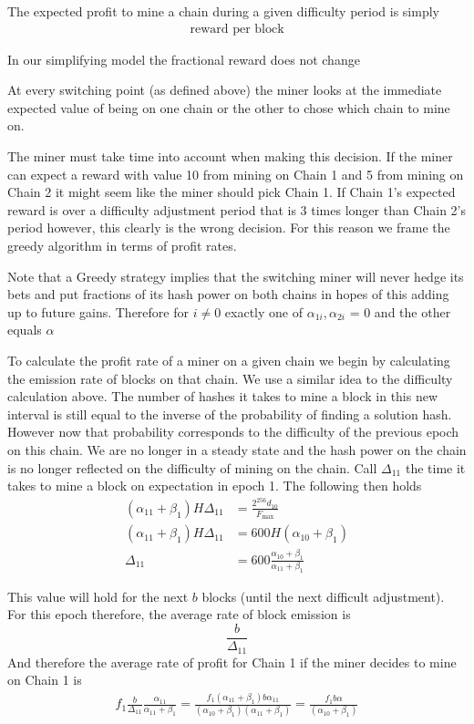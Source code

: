 \documentclass[12pt, preprint]{aastex}
\begin{document}
The expected profit to mine a chain during a given difficulty period is simply  
\begin{align*}
\text{reward per block} 
\end{align*}

In our simplifying model the fractional reward does not change 

At every switching point (as defined above) the miner looks at the immediate expected value of being on one chain or the other to chose which chain to mine on.

The miner must take time into account when making this decision.  If the miner can expect a reward with value 10 from mining on Chain 1 and 5 from mining on Chain 2 it might seem like the miner should pick Chain 1.  If Chain 1's expected reward is over a difficulty adjustment period that is 3 times longer than Chain 2's period however, this clearly is the wrong decision.  For this reason we frame the greedy algorithm in terms of profit rates.

Note that a Greedy strategy implies that the switching miner will never hedge its bets and put fractions of its hash power on both chains in hopes of this adding up to future gains.  Therefore for $i \neq 0$ exactly one of $\alpha_{1i}, \alpha_{2i}$ = 0 and the other equals $\alpha$

To calculate the profit rate of a miner on a given chain we begin by calculating the emission rate of blocks on that chain.  We use a similar idea to the difficulty calculation above.  The number of hashes it takes to mine a block in this new interval is still equal to the inverse of the probability of finding a solution hash.  However now that probability corresponds to the difficulty of the previous epoch on this chain.  We are no longer in a steady state and the hash power on the chain is no longer reflected on the difficulty of mining on the chain.  Call $\Delta_{11}$ the time it takes to mine a block on expectation in epoch 1.  The following then holds
\begin{align*}
(\alpha_{11} + \beta_1)H\Delta_{11} &= \frac{2^{256}d_{10}}{F_{\text{max}}}\\
(\alpha_{11} + \beta_1)H\Delta_{11} &= 600H(\alpha_{10} + \beta_1)\\
\Delta_{11} &= 600 \frac{\alpha_{10} + \beta_1}{ \alpha_{11} + \beta_1}
\end{align*}

This value will hold for the next $b$ blocks (until the next difficult adjustment).  For this epoch therefore, the average rate of block emission is 
$$
\frac{b}{\Delta_{11} }
$$
And therefore the average rate of profit for Chain 1 if the miner decides to mine on Chain 1 is
\begin{align*}
f_1 \frac{b}{\Delta_{11} } \frac{\alpha_{11}}{ \alpha_{11} + \beta_1} = \frac{f_1 ( \alpha_{11} + \beta_1) b \alpha_{11}}{(\alpha_{10} + \beta_1)(\alpha_{11} + \beta_1)} = \frac{f_1 b \alpha}{(\alpha_{10} + \beta_1)}\\
\end{align*}
\end{document}
